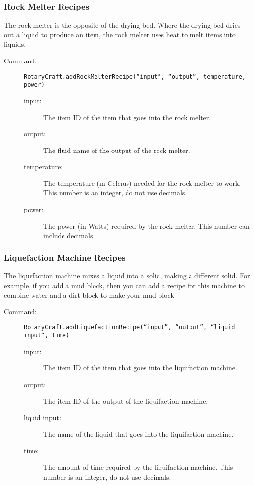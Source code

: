 \documentclass[letterpaper,titlepage,12pt]{article}
\begin{document}
\subsubsection{Rock Melter Recipes}

The rock melter is the opposite of the drying bed.  Where the drying bed dries out a liquid to produce an item, the rock melter uses heat to melt items into liquids.

\begin{description}
\item[Command:] \texttt{RotaryCraft.addRockMelterRecipe(``input'', ``output'', temperature, power)}
\begin{description}
\item [input:] The item ID of the item that goes into the rock melter.
\item [output:] The fluid name of the output of the rock melter.
\item [temperature:] The temperature (in Celcius) needed for the rock melter to work.  This number is an integer, do not use decimals.
\item [power:] The power (in Watts) required by the rock melter.  This number can include decimals.
\end{description}
\end{description}

\subsubsection{Liquefaction Machine Recipes}

The liquefaction machine mixes a liquid into a solid, making a different solid.  For example, if you add a mud block, then you can add a recipe for this machine to combine water and a dirt block to make your mud block

\begin{description}
\item[Command:] \texttt{RotaryCraft.addLiquefactionRecipe(``input'', ``output'', ``liquid input'', time)}
\begin{description}
\item [input:] The item ID of the item that goes into the liquifaction machine.
\item [output:] The item ID of the output of the liquifaction machine.
\item [liquid input:] The name of the liquid that goes into the liquifaction machine.
\item [time:] The amount of time required by the liquifaction machine.  This number is an integer, do not use decimals.
\end{description}
\end{description}
\end{document}
